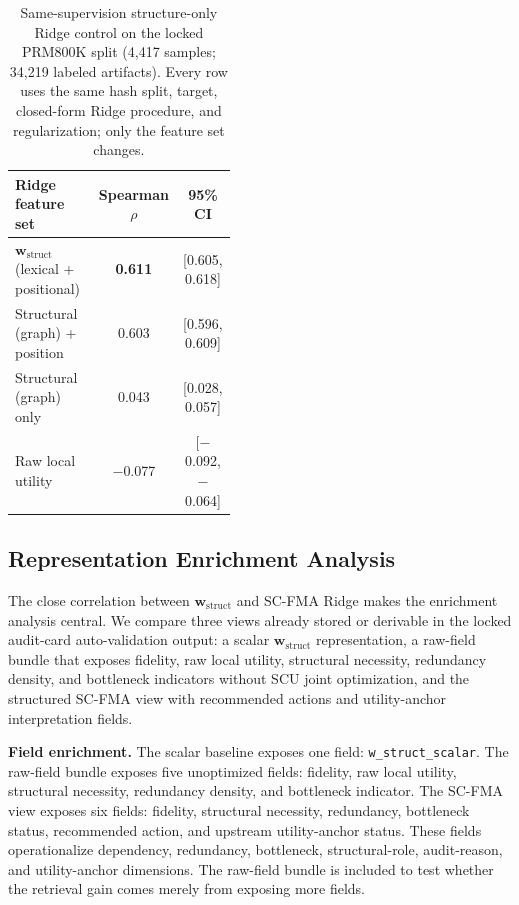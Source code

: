 \documentclass[pdflatex,sn-mathphys-num,iicol]{sn-jnl}
\newcommand{\wstruct}{\ensuremath{\mathbf{w}_{\mathrm{struct}}}}
\begin{document}
\begin{table}[ht]
\caption{Same-supervision structure-only Ridge control on the locked PRM800K split (4,417 samples; 34,219 labeled artifacts). Every row uses the same hash split, target, closed-form Ridge procedure, and regularization; only the feature set changes.}
\label{tab:structure-only-control}
\centering
\small
\renewcommand{\arraystretch}{1.08}
\begin{tabular}{Z{0.44\linewidth}cc}
\toprule
\textbf{Ridge feature set} & \textbf{Spearman $\rho$} & \textbf{95\% CI} \\
\midrule
\wstruct{} (lexical + positional) & \textbf{0.611} & [0.605, 0.618] \\
Structural (graph) + position & 0.603 & [0.596, 0.609] \\
Structural (graph) only & 0.043 & [0.028, 0.057] \\
Raw local utility & $-$0.077 & [$-$0.092, $-$0.064] \\
\bottomrule
\end{tabular}
\end{table}

\subsection{Representation Enrichment Analysis}
\label{sec:representation-enrichment}

The close correlation between \wstruct{} and SC-FMA Ridge makes the enrichment analysis central. We compare three views already stored or derivable in the locked audit-card auto-validation output: a scalar \wstruct{} representation, a raw-field bundle that exposes fidelity, raw local utility, structural necessity, redundancy density, and bottleneck indicators without SCU joint optimization, and the structured SC-FMA view with recommended actions and utility-anchor interpretation fields.

\textbf{Field enrichment.} The scalar baseline exposes one field: \texttt{w\_struct\_scalar}. The raw-field bundle exposes five unoptimized fields: fidelity, raw local utility, structural necessity, redundancy density, and bottleneck indicator. The SC-FMA view exposes six fields: fidelity, structural necessity, redundancy, bottleneck status, recommended action, and upstream utility-anchor status. These fields operationalize dependency, redundancy, bottleneck, structural-role, audit-reason, and utility-anchor dimensions. The raw-field bundle is included to test whether the retrieval gain comes merely from exposing more fields.
\end{document}
